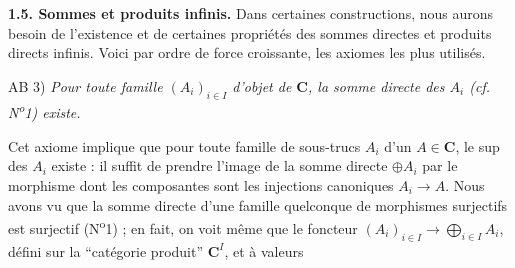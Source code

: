 \noindent\textbf{1.5. Sommes et produits infinis.}
Dans certaines constructions, nous aurons besoin de l'existence et de
certaines propriétés des sommes directes et produits directs infinis. Voici
par ordre de force croissante, les axiomes les plus utilisés.

\noindent AB 3) \textit{Pour toute famille $(A_i)_{i\in I}$ d'objet de
$\mathbf{C}$, la somme directe des $A_i$ (cf. N\textsuperscript{o}1) existe.}

Cet axiome implique que pour toute famille de sous-trucs $A_i$ d'un $A\in\mathbf{C}$,
le sup des $A_i$ existe : il suffit de prendre l'image de la somme directe
$\oplus A_i$ par le morphisme dont les composantes sont les
injections canoniques $A_i\to A$. Nous avons vu que la somme
directe d'une famille quelconque de morphismes surjectifs est surjectif
(N\textsuperscript{o}1) ; en fait, on voit même que le foncteur $(A_i)_{i\in I}\to\displaystyle\bigoplus_{i\in I}A_i$, défini sur la ``catégorie produit'' $\mathbf{C}^I$, et à valeurs

